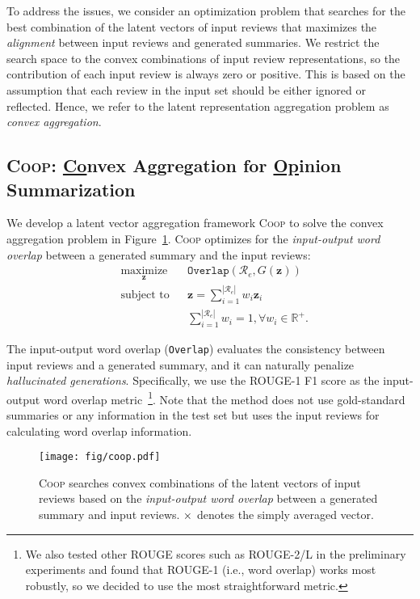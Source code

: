 \documentclass[11pt]{article}
\newcommand{\aggname}{\textsc{Coop}}
\newcommand{\hl}[1]{#1}
\begin{document}
To address the issues, we consider an optimization problem that searches for the best combination of the latent vectors of input reviews that maximizes the {\em alignment} between input reviews and generated summaries.
We restrict the search space to the convex combinations of input review representations, so the contribution of each input review is always zero or positive. This is based on the assumption that each review in the input set should be either ignored or reflected. Hence, we refer to the latent representation aggregation problem as {\em convex aggregation}.

\subsection{\aggname{}: \underline{Co}nvex Aggregation for \underline{Op}inion Summarization}
We develop a latent vector aggregation framework \aggname{} to solve the convex aggregation problem \hl{in Figure~\ref{fig:coop}}. \aggname{} optimizes for the {\em input-output word overlap} between a generated summary and the input reviews:
{
\setlength{\abovedisplayskip}{2mm}
\setlength{\belowdisplayskip}{2mm}
\setlength{\abovedisplayshortskip}{0pt}
\setlength{\belowdisplayshortskip}{0pt}
\begin{align*}
& \underset{\boldsymbol{z}}{\text{maximize}} & & \texttt{Overlap}(\mathcal{R}_e, G(\boldsymbol{z})) \\
& \text{subject to} & & \boldsymbol{z} = \sum_{i = 1}^{|\mathcal{R}_e|} w_i \boldsymbol{z}_i \\
& & & \sum_{i = 1}^{|\mathcal{R}_e|} w_i = 1, \forall w_i \in \mathbb{R}^{+}.
\end{align*}
}

The input-output word overlap ({\tt Overlap}) evaluates the consistency between input reviews and a generated summary, and it can naturally penalize {\em hallucinated generations}. Specifically, we use the ROUGE-1 F1 score as the input-output word overlap metric~\cite{lin-2004-rouge}\footnote{We also tested other ROUGE scores such as ROUGE-2/L in the preliminary experiments and found that ROUGE-1 (i.e., word overlap) works most robustly, so we decided to use the most straightforward metric.}.
Note that the method does not use gold-standard summaries or any information in the test set but uses the input reviews for calculating word overlap information.

\begin{figure}[t]
    \centering
    \texttt{[image: fig/coop.pdf]}
    \caption{\aggname{} \hl{searches} convex combinations of the latent \hl{vectors} of input reviews based on the {\em input-output word overlap} between a generated summary and input reviews. ${\bf \times}$ denotes the simply averaged vector.}
    \label{fig:coop}
\end{figure}
\end{document}
